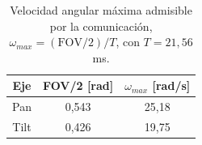 \begin{table}[htbp]
    \centering
    \caption{Velocidad angular máxima admisible por la comunicación, $\omega_{max} = (\mathrm{FOV}/2)/T$, con $T = 21{,}56$ ms.}
    \label{tab:velocidad_max_comms}
    \begin{tabular}{ccc}
        \hline
        \textbf{Eje} & \textbf{FOV/2 [rad]} & \textbf{$\omega_{max}$ [rad/s]} \\
        \hline
        Pan  & 0,543 & 25,18 \\
        Tilt & 0,426 & 19,75 \\
        \hline
    \end{tabular}
\end{table}
